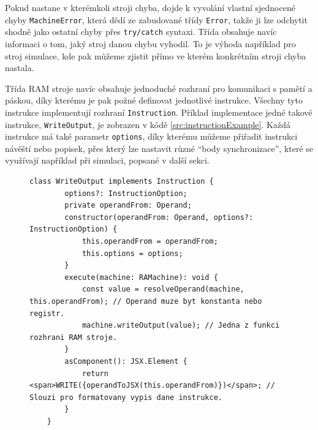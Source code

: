 Pokud nastane v kterémkoli stroji chyba, dojde k vyvolání vlastní sjednocené chyby \texttt{MachineError}, 
která dědí ze zabudované třídy \texttt{Error}, takže ji lze odchytit shodně jako ostatní chyby přes \texttt{try/catch} syntaxi.
Třída obsahuje navíc informaci o tom, jaký stroj danou chybu vyhodil. 
To je výhoda například pro stroj simulace, kde pak můžeme zjistit přímo ve kterém konkrétním stroji chyba nastala.

Třída RAM stroje navíc obsahuje jednoduché rozhraní pro komunikaci s pamětí a páskou, díky kterému je pak požné definovat jednotlivé instrukce.
Všechny tyto instrukce implementují rozhraní \texttt{Instruction}. Příklad implementace jedné takové instrukce, \texttt{WriteOutput}, je zobrazen v kódě \ref{src:instructionExample}.
Každá instrukce má také parametr \texttt{options}, díky kterému můžeme přiřadit instrukci návěští nebo popisek, 
přes který lze nastavit různé \enquote{body synchronizace}, které se využívají například při simulaci, popsané v další sekci.

\begin{figure}[h!]
	\begin{lstlisting}[label=src:instructionExample,caption={Ukázka kódu instrukce \texttt{WriteOutput}}]
	class WriteOutput implements Instruction {
		options?: InstructionOption;
		private operandFrom: Operand;
		constructor(operandFrom: Operand, options?: InstructionOption) {
			this.operandFrom = operandFrom;
			this.options = options;
		}
		execute(machine: RAMachine): void {
			const value = resolveOperand(machine, this.operandFrom); // Operand muze byt konstanta nebo registr.
			machine.writeOutput(value); // Jedna z funkci rozhrani RAM stroje.
		}
		asComponent(): JSX.Element {
			return <span>WRITE({operandToJSX(this.operandFrom)})</span>; // Slouzi pro formatovany vypis dane instrukce.
		}
	}
	\end{lstlisting}
\end{figure}



